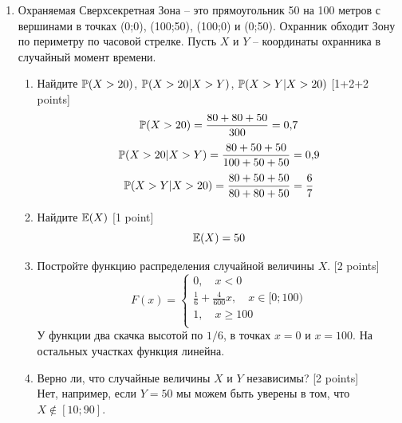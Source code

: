 \documentclass[12pt, a4paper]{article}\usepackage[]{graphicx}\usepackage[]{color}
\begin{document}
\begin{enumerate}
\item Охраняемая Сверхсекретная Зона -- это прямоугольник 50 на 100 метров с вершинами в точках (0;0), (100;50), (100;0) и (0;50).  Охранник обходит Зону по периметру по часовой стрелке. Пусть $X$ и $Y$ -- координаты охранника в случайный момент времени.
\begin{enumerate}
\item Найдите $\P(X>20)$, $\P(X>20|X>Y)$, $\P(X>Y|X>20)$ [1+2+2 points]
\begin{equation}
\P(X>20)=\frac{80+80+50}{300}=0{,}7
\end{equation}
\begin{equation}
\P(X>20|X>Y)=\frac{80+50+50}{100+50+50}=0{,}9
\end{equation}
\begin{equation}
\P(X>Y|X>20)=\frac{80+50+50}{80+80+50}=\frac{6}{7}
\end{equation}
\item Найдите $\E(X)$ [1 point]%
\begin{equation}
\E(X)=50
\end{equation}
\item Постройте функцию распределения случайной величины $X$. [2 points]
\begin{equation}
F(x)=
\begin{cases}
    0, \quad x<0 \\
    \frac{1}{6}+\frac{4}{600}x, \quad x\in [0;100) \\
    1, \quad x\geq 100 \\
\end{cases}
\end{equation}
У функции два скачка высотой по $1/6$, в точках $x=0$ и $x=100$. На остальных участках функция линейна.
\item Верно ли, что случайные величины $X$ и $Y$ независимы?  [2 points] \\
Нет, например, если $Y=50$ мы можем быть уверены в том, что $X\notin [10;90]$.

\end{enumerate}





\end{enumerate}
\end{document}
